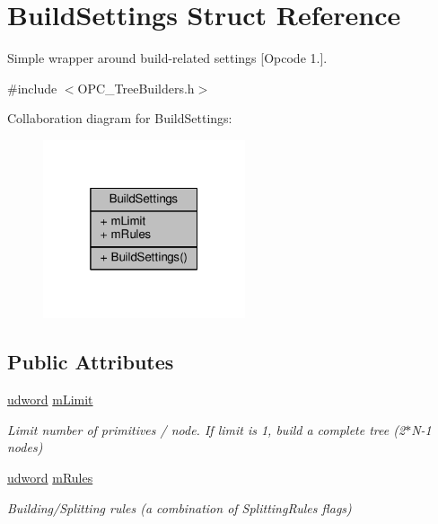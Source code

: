 \hypertarget{structBuildSettings}{}\section{Build\+Settings Struct Reference}
\label{structBuildSettings}


Simple wrapper around build-\/related settings \mbox{[}Opcode 1.\mbox{]}.  




{\ttfamily \#include $<$O\+P\+C\+\_\+\+Tree\+Builders.\+h$>$}



Collaboration diagram for Build\+Settings\+:
\nopagebreak
\begin{figure}[H]
\begin{center}
\leavevmode
\includegraphics[width=169pt]{de/de7/structBuildSettings__coll__graph}
\end{center}
\end{figure}
\subsection*{Public Attributes}
\begin{DoxyCompactItemize}
\item 
\hyperlink{IceTypes_8h_a44c6f1920ba5551225fb534f9d1a1733}{udword} \hyperlink{structBuildSettings_adbb3ccc7333ad8b997d1909a5dc8d9a1}{m\+Limit}\hypertarget{structBuildSettings_adbb3ccc7333ad8b997d1909a5dc8d9a1}{}\label{structBuildSettings_adbb3ccc7333ad8b997d1909a5dc8d9a1}

\begin{DoxyCompactList}\small\item\em Limit number of primitives / node. If limit is 1, build a complete tree (2$\ast$\+N-\/1 nodes) \end{DoxyCompactList}\item 
\hyperlink{IceTypes_8h_a44c6f1920ba5551225fb534f9d1a1733}{udword} \hyperlink{structBuildSettings_ad14dde5bf9e78ec536efe5f4d1bb8885}{m\+Rules}\hypertarget{structBuildSettings_ad14dde5bf9e78ec536efe5f4d1bb8885}{}\label{structBuildSettings_ad14dde5bf9e78ec536efe5f4d1bb8885}

\begin{DoxyCompactList}\small\item\em Building/\+Splitting rules (a combination of Splitting\+Rules flags) \end{DoxyCompactList}\end{DoxyCompactItemize}


